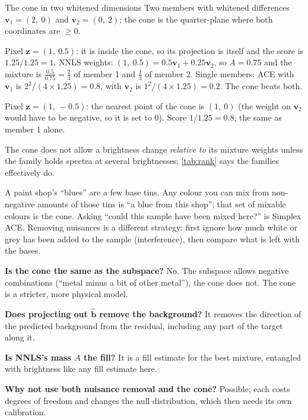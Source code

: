 \documentclass[11pt,a4paper,oneside,openany]{book}
\newcommand{\B}[1]{{\symbf{#1}}}
\newcommand{\B}[1]{{\bm{#1}}}
\newcommand{\vbh}{\hat{\B{b}}}
\newcommand{\vv}{\B{v}}
\newcommand{\vz}{\B{z}}
\begin{document}
\begin{worked}[label=we:cone]{The cone in two whitened dimensions}
Two members with whitened differences $\vv_1=(2,\ 0)$ and $\vv_2=(0,\ 2)$; the cone is the quarter-plane where both coordinates are $\ge0$.

Pixel $\vz=(1,\ 0.5)$: it is inside the cone, so its projection is itself and the score is $1.25/1.25=1$. NNLS weights: $(1,\ 0.5)=0.5\vv_1+0.25\vv_2$,
so $A=0.75$ and the mixture is $\frac{0.5}{0.75}=\frac23$ of member 1 and $\frac13$ of member 2. Single members: ACE with $\vv_1$ is
$2^2/(4\times1.25)=0.8$, with $\vv_2$ is $1^2/(4\times1.25)=0.2$. The cone beats both.

Pixel $\vz=(1,\ -0.5)$: the nearest point of the cone is $(1,\ 0)$ (the weight on $\vv_2$ would have to be negative, so it is set to 0). Score
$1/1.25=0.8$, the same as member 1 alone.
\end{worked}

The cone does not allow a brightness change \emph{relative to} its mixture weights unless the family holds spectra at several brightnesses;
\cref{tab:rank} says the families effectively do.

\begin{analogy}
A paint shop's ``blues'' are a few base tins. Any colour you can mix from non-negative amounts of those tins is ``a blue from this shop''; that set
of mixable colours is the cone. Asking ``could this sample have been mixed here?'' is Simplex ACE. Removing nuisances is a different strategy: first
ignore how much white or grey has been added to the sample (interference), then compare what is left with the bases.
\end{analogy}

\begin{confusions}
\textbf{Is the cone the same as the subspace?} No. The subspace allows negative combinations (``metal minus a bit of other metal''), the cone does not.
The cone is a stricter, more physical model.

\textbf{Does projecting out $\vbh$ remove the background?} It removes the direction of the predicted background from the residual, including any part
of the target along it.

\textbf{Is NNLS's mass $A$ the fill?} It is a fill estimate for the best mixture, entangled with brightness like any fill estimate here.

\textbf{Why not use both nuisance removal and the cone?} Possible; each costs degrees of freedom and changes the null distribution, which then needs
its own calibration.
\end{confusions}
\end{document}
